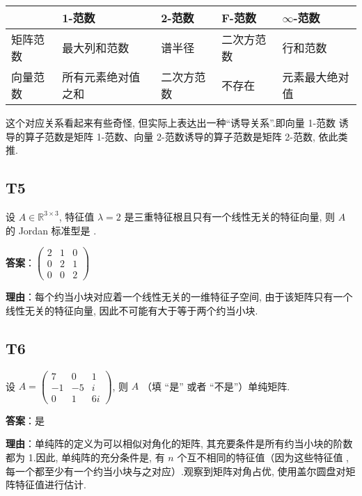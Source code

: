 \documentclass{article}
\begin{document}
\begin{tabularx}{\linewidth}{|X|X|X|X|X|} 
	\hline
	 & 1-范数 & 2-范数 & F-范数 & $\infty$-范数 \\ 
	\hline
	矩阵范数 & 最大列和范数 & 谱半径 & 二次方范数 & 行和范数 \\ 
	\hline
	向量范数 & 所有元素绝对值之和 & 二次方范数 & 不存在 & 元素最大绝对值 \\ 
	\hline
\end{tabularx}

\par 这个对应关系看起来有些奇怪, 但实际上表达出一种“诱导关系”.即向量 1-范数 诱导的算子范数是矩阵 1-范数、向量 2-范数诱导的算子范数是矩阵 2-范数, 依此类推.

\subsection{T5}

\par 设 $A\in \mathbb R^{3\times 3}$, 特征值 $\lambda=2$ 是三重特征根且只有一个线性无关的特征向量, 则 $A$ 的 Jordan 标准型是 \underline{\phantom{empty\_space}}.

\par\textbf{答案}：$\begin{pmatrix}
	2 & 1 & 0\\
	0 & 2 & 1\\
	0 & 0 & 2
\end{pmatrix}$

\par \textbf{理由}：每个约当小块对应着一个线性无关的一维特征子空间, 由于该矩阵只有一个线性无关的特征向量, 因此不可能有大于等于两个约当小块.

\subsection{T6}

\par 设 $A=\begin{pmatrix}
	7 & 0 & 1\\
	-1 & -5 & i\\
	0 & 1 & 6i
\end{pmatrix}$, 则 $A$ \underline{\phantom{empty\_space}}（填 “是” 或者 “不是”）单纯矩阵.

\par \textbf{答案}：是

\par \textbf{理由}：单纯阵的定义为可以相似对角化的矩阵, 其充要条件是所有约当小块的阶数都为 1.因此, 单纯阵的充分条件是, 有 $n$ 个互不相同的特征值（因为这些特征值 , 每一个都至少有一个约当小块与之对应）.观察到矩阵对角占优, 使用盖尔圆盘对矩阵特征值进行估计.
\end{document}
